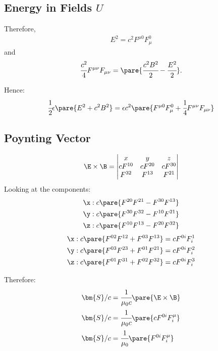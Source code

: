 \subsection{Energy in Fields $U$}
  \label{sub:energy_tensor}

  Therefore,
  \begin{align}
    E^2 = c^2F^{\mu0}F_\mu^0
  \end{align}
  and
  \begin{align}
    \cfrac{c^2}{4} F^{\mu\nu}F_{\mu\nu} = \pare{\cfrac{c^2B^2}{2} - \cfrac{E^2}{2}}.
  \end{align}

  Hence:
  \begin{align}
    \cfrac{1}{2}\epsilon\pare{E^2 + c^2B^2} = \epsilon c^2 \pare{ F^{\mu0}F_\mu^0 + \cfrac{1}{4} F^{\mu\nu}F_{\mu\nu}}
  \end{align}

\subsection{Poynting Vector}
  \begin{align}
    \E \times \B =
    \begin{vmatrix}
      x & y & z \\
      cF^{10} & cF^{20} & cF^{30} \\
      F^{32} & F^{13} & F^{21}
    \end{vmatrix}
  \end{align}
  Looking at the components:
  \begin{align}
    \x: c\pare{F^{20}F^{21}-F^{30}F^{13}}\\
    \y: c\pare{F^{30}F^{32}-F^{10}F^{21}}\\
    \z: c\pare{F^{10}F^{13}-F^{20}F^{32}}
  \end{align}
  \begin{align}
    \x: c\pare{F^{02}F^{12}+F^{03}F^{13}} = cF^{0i}F^1_i\\
    \y: c\pare{F^{03}F^{23}+F^{01}F^{21}} = cF^{0i}F^2_i\\
    \z: c\pare{F^{01}F^{31}+F^{02}F^{32}} = cF^{0i}F^3_i
  \end{align}

  Therefore:
  \begin{align}
    \bm{S}/c &= \cfrac{1}{\mu_0c}\pare{\E\times\B} \\
    \bm{S}/c &= \cfrac{1}{\mu_0c}\pare{cF^{0i}F^\mu_i}\\
    \bm{S}/c &= \cfrac{1}{\mu_0}\pare{F^{0i}F^\mu_i}
  \end{align}

